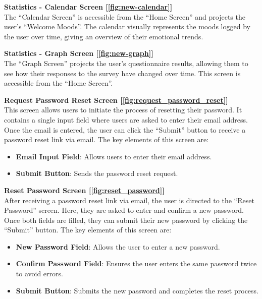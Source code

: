 \vspace{5mm}

\noindent \textbf{Statistics - Calendar Screen [\ref{fig:new-calendar}]} \\
The ``Calendar Screen'' is accessible from the ``Home Screen'' and projects the user's ``Welcome Moods''. The calendar visually represents the moods logged by the user over time, giving an overview of their emotional trends.

\vspace{5mm}

\noindent \textbf{Statistics - Graph Screen [\ref{fig:new-graph}]} \\
The ``Graph Screen'' projects the user's questionnaire results, allowing them to see how their responses to the survey have changed over time. This screen is accessible from the ``Home Screen''.

\vspace{5mm}

\noindent \textbf{Request Password Reset Screen [\ref{fig:request_password_reset}]} \\
This screen allows users to initiate the process of resetting their password. It contains a single input field where users are asked to enter their email address. Once the email is entered, the user can click the ``Submit'' button to receive a password reset link via email. The key elements of this screen are:
\begin{itemize}
    \item \textbf{Email Input Field}: Allows users to enter their email address.
    \item \textbf{Submit Button}: Sends the password reset request.
\end{itemize}

\vspace{5mm}

\noindent \textbf{Reset Password Screen [\ref{fig:reset_password}]} \\
After receiving a password reset link via email, the user is directed to the ``Reset Password'' screen. Here, they are asked to enter and confirm a new password. Once both fields are filled, they can submit their new password by clicking the ``Submit'' button. The key elements of this screen are:
\begin{itemize}
    \item \textbf{New Password Field}: Allows the user to enter a new password.
    \item \textbf{Confirm Password Field}: Ensures the user enters the same password twice to avoid errors.
    \item \textbf{Submit Button}: Submits the new password and completes the reset process.
\end{itemize}

